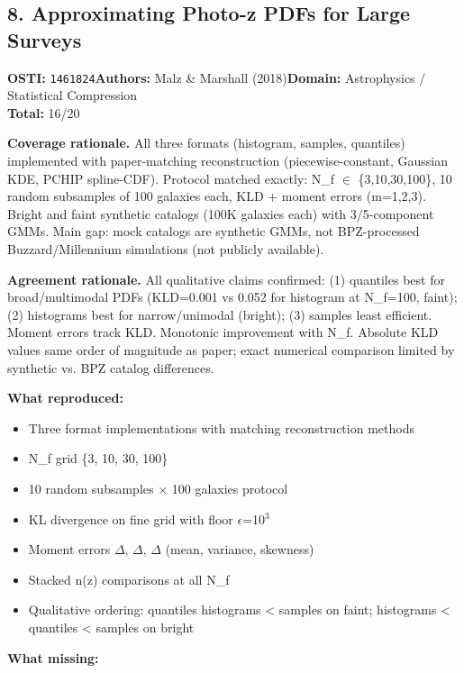\subsection{8. Approximating Photo-z PDFs for Large Surveys}
\textbf{OSTI:} \texttt{1461824}\quad\textbf{Authors:} Malz \& Marshall (2018)\quad\textbf{Domain:} Astrophysics / Statistical Compression\\
\quad{}\quad\textbf{Total:} 16/20\par\smallskip
\noindent\textbf{Coverage rationale.} All three formats (histogram, samples, quantiles) implemented with paper-matching reconstruction (piecewise-constant, Gaussian KDE, PCHIP spline-CDF). Protocol matched exactly: N\_f $\in$ \{3,10,30,100\}, 10 random subsamples of 100 galaxies each, KLD + moment errors (m=1,2,3). Bright and faint synthetic catalogs (100K galaxies each) with 3/5-component GMMs. Main gap: mock catalogs are synthetic GMMs, not BPZ-processed Buzzard/Millennium simulations (not publicly available).\par
\noindent\textbf{Agreement rationale.} All qualitative claims confirmed: (1) quantiles best for broad/multimodal PDFs (KLD=0.001 vs 0.052 for histogram at N\_f=100, faint); (2) histograms best for narrow/unimodal (bright); (3) samples least efficient. Moment errors track KLD. Monotonic improvement with N\_f. Absolute KLD values same order of magnitude as paper; exact numerical comparison limited by synthetic vs. BPZ catalog differences.\par\smallskip
\noindent\textbf{What reproduced:}
\begin{itemize}[leftmargin=1.4em,itemsep=0.2em,topsep=0.2em]
\item Three format implementations with matching reconstruction methods
\item N\_f grid \{3, 10, 30, 100\}
\item 10 random subsamples $\times$ 100 galaxies protocol
\item KL divergence on fine grid with floor $\epsilon$=10$^3$
\item Moment errors $\Delta$, $\Delta$, $\Delta$ (mean, variance, skewness)
\item Stacked n(z) comparisons at all N\_f
\item Qualitative ordering: quantiles  histograms \textless{} samples on faint; histograms \textless{} quantiles \textless{} samples on bright
\end{itemize}\noindent\textbf{What missing:}
